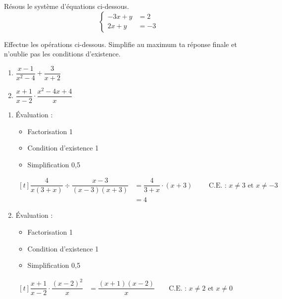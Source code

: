 \documentclass[../partie2.tex]{subfiles}
\begin{document}
\begin{exercise}[points=2]
    Résous le système d'équations ci-dessous.
              \[\left\{\begin{aligned}
                  -3x+y & = 2 \\
                  2x+y  & =-3
              \end{aligned}\right.\]
\end{exercise}
\begin{solution}

\end{solution}
\begin{exercise}[points=5]
    Effectue les opérations ci-dessous. Simplifie au maximum ta réponse finale et n'oublie pas les conditions d'existence.
    \begin{enumerate}[cols=2]
        \item %
              $\dfrac{x-1}{x^2-4} + \dfrac{3}{x+2}$
        \item %
              $\dfrac{x+1}{x-2}\cdot\dfrac{x^2-4x+4}{x}$
    \end{enumerate}
\end{exercise}
\begin{solution}
    \begin{enumerate}
        \item
              Évaluation :
              \begin{itemize}
                  \item Factorisation \hfill 1
                  \item Condition d'existence \hfill 1
                  \item Simplification \hfill 0,5
              \end{itemize}
              $\begin{aligned}[t]
                      \dfrac{4}{x(3+x)}\div\dfrac{x-3}{(x-3)(x+3)} & = \dfrac{4}{3+x}\cdot (x+3)
                      \qquad\text{ C.E. : }x\ne 3\text{ et } x\ne -3                             \\
                                                                   & = 4
                  \end{aligned}$
        \item
              Évaluation :
              \begin{itemize}
                  \item Factorisation \hfill 1
                  \item Condition d'existence \hfill 1
                  \item Simplification \hfill 0,5
              \end{itemize}
              $\begin{aligned}[t]
                      \dfrac{x+1}{x-2} \cdot \dfrac{(x-2)^2}{x}
                       & = \dfrac{(x+1)(x-2)}{x}\qquad\text{C.E. : }x\ne 2 \text{ et } x \ne 0 \\
                  \end{aligned}$
    \end{enumerate}
\end{solution}
\end{document}
